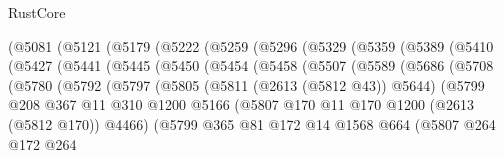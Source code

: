 \begin{lexlean}{RustCore}
\begin{coremodule}
        (@5081
          (@5121
            (@5179
              (@5222
                (@5259
                  (@5296
                    (@5329
                      (@5359
                        (@5389
                          (@5410
                            (@5427
                              (@5441
                                (@5445
                                  (@5450
                                    (@5454
                                      (@5458
                                        (@5507
                                          (@5589
                                            (@5686
                                              (@5708
                                                (@5780
                                                  (@5792
                                                    (@5797
                                                      (@5805
                                                        (@5811 (@2613 (@5812 @43)) @5644)
                                                        (@5799
                                                          @208
                                                          @367
                                                          @11
                                                          @310
                                                          @1200
                                                          @5166
                                                          (@5807
                                                            @170
                                                            @11
                                                            @170
                                                            @1200
                                                            (@2613 (@5812 @170))
                                                            @4466)
                                                          (@5799
                                                            @365
                                                            @81
                                                            @172
                                                            @14
                                                            @1568
                                                            @664
                                                            (@5807
                                                              @264
                                                              @172
                                                              @264

\end{coremodule}
\end{lexlean}
